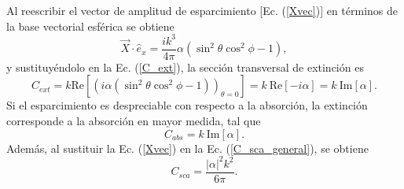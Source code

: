  Al reescribir el vector de amplitud de esparcimiento [Ec. (\ref{Xvec})] en términos de la base vectorial esférica se obtiene \cite{Bohren}
\begin{equation*}
	\Vec{X}\cdot\hat{e}_x=\frac{ik^3}{4\pi}\alpha(\sin^2\theta\cos^2\phi-1),  
\end{equation*}
y sustituyéndolo en la Ec. (\ref{C_ext}), la sección transversal de extinción es
\begin{equation*}
	C_{ext}=k \mbox{Re}\left[\left(i\alpha(\sin^2\theta\cos^2\phi-1)\right)_{\theta=0}\right]=k\:\mbox{Re}\left[-i\alpha\right]=k\: \mbox{Im}[\alpha].
\end{equation*}
 Si el esparcimiento es despreciable con respecto a la absorción, la extinción corresponde a la absorción en mayor medida, tal que \cite{Bohren}
\begin{equation}
	C_{abs}=k\: \mbox{Im}[\alpha].    
\end{equation}
Además, al sustituir la Ec. (\ref{Xvec}) en la Ec. (\ref{C_sca_general}), se obtiene \cite{Bohren}
\begin{equation}
	C_{sca}=\frac{|\alpha|^2 k^2}{6\pi}.    
\end{equation}
